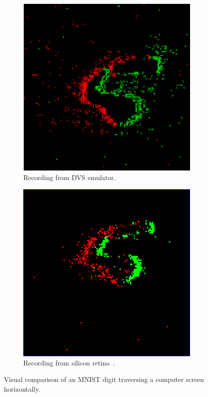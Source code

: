 \documentclass[conference]{IEEEtran}
\begin{document}
\begin{figure}[htb]
\captionsetup[subfigure]{justification=centering}

\centering
\begin{subfigure}[b]{0.24\textwidth}
  \includegraphics[width=\textwidth]{camera_demo}
  \caption{Recording from DVS emulator. }
  \label{fig:cam_demo}
\end{subfigure}
\begin{subfigure}[b]{0.24\textwidth}
  \includegraphics[width=\textwidth]{dvs_demo}
  \caption{Recording from silicon retina~\cite{bernabeDVS}.}
  \label{fig:dvs_demo}
\end{subfigure}
  
  \caption{Visual comparison of an MNIST digit traversing a computer screen horizontally.}
  \label{fig:dvs_vs_cam}
  
\end{figure}
\end{document}
